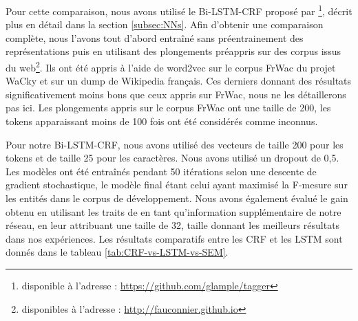 \documentclass[citation\_needed]{subfiles}
\begin{document}
Pour cette comparaison, nous avons utilisé le Bi-LSTM-CRF proposé par \citet{lample2016neural}\footnote{disponible à l'adresse : \url{https://github.com/glample/tagger}}, décrit plus en détail dans la section \ref{subsec:NNs}. Afin d'obtenir une comparaison complète, nous l'avons tout d'abord entraîné sans préentrainement des représentations puis en utilisant des plongements préappris sur des corpus issus du web\footnote{disponibles à l'adresse : \url{http://fauconnier.github.io}}. Ils ont été appris à l'aide de word2vec \citep{mikolov2014word2vec} sur le corpus FrWac du projet WaCky \citep{baroni2009wacky} et sur un dump de Wikipedia français. Ces derniers donnant des résultats significativement moins bons que ceux appris sur FrWac, nous ne les détaillerons pas ici. Les plongements appris sur le corpus FrWac ont une taille de 200, les tokens apparaissant moins de 100 fois ont été considérés comme inconnus.

Pour notre Bi-LSTM-CRF, nous avons utilisé des vecteurs de taille 200 pour les tokens et de taille 25 pour les caractères. Nous avons utilisé un dropout de 0,5. Les modèles ont été entraînés pendant 50 itérations selon une descente de gradient stochastique, le modèle final étant celui ayant maximisé la F-mesure sur les entités dans le corpus de développement. Nous avons également évalué le gain obtenu en utilisant les traits de \citet{raymond2010reconnaissance} en tant qu'information supplémentaire de notre réseau, en leur attribuant une taille de 32, taille donnant les meilleurs résultats dans nos expériences. Les résultats comparatifs entre les CRF et les LSTM sont donnés dans le tableau \ref{tab:CRF-vs-LSTM-vs-SEM}.
\end{document}
